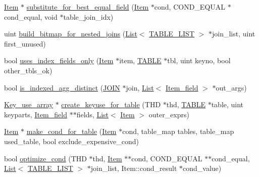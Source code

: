 \begin{DoxyCompactItemize}
\item 
\mbox{\hyperlink{classItem}{Item}} $\ast$ \mbox{\hyperlink{group__Query__Optimizer_ga253393c0747cf378b9cefa109662bd17}{substitute\+\_\+for\+\_\+best\+\_\+equal\+\_\+field}} (\mbox{\hyperlink{classItem}{Item}} $\ast$cond, C\+O\+N\+D\+\_\+\+E\+Q\+U\+AL $\ast$cond\+\_\+equal, void $\ast$table\+\_\+join\+\_\+idx)
\item 
uint \mbox{\hyperlink{group__Query__Optimizer_gab18726347ecf92d8985617dda1d60ba3}{build\+\_\+bitmap\+\_\+for\+\_\+nested\+\_\+joins}} (\mbox{\hyperlink{classList}{List}}$<$ \mbox{\hyperlink{structTABLE__LIST}{T\+A\+B\+L\+E\+\_\+\+L\+I\+ST}} $>$ $\ast$join\+\_\+list, uint first\+\_\+unused)
\item 
bool \mbox{\hyperlink{group__Query__Optimizer_ga652bf7109dfbe0fdd7deb75c05c0a7a3}{uses\+\_\+index\+\_\+fields\+\_\+only}} (\mbox{\hyperlink{classItem}{Item}} $\ast$item, \mbox{\hyperlink{structTABLE}{T\+A\+B\+LE}} $\ast$tbl, uint keyno, bool other\+\_\+tbls\+\_\+ok)
\item 
bool \mbox{\hyperlink{group__Query__Optimizer_gaa992e841315769954816105b951d3e17}{is\+\_\+indexed\+\_\+agg\+\_\+distinct}} (\mbox{\hyperlink{classJOIN}{J\+O\+IN}} $\ast$join, \mbox{\hyperlink{classList}{List}}$<$ \mbox{\hyperlink{classItem__field}{Item\+\_\+field}} $>$ $\ast$out\+\_\+args)
\item 
\mbox{\hyperlink{classMem__root__array}{Key\+\_\+use\+\_\+array}} $\ast$ \mbox{\hyperlink{group__Query__Optimizer_ga7a5efe6ddb0de3a2b43f36c3330354e7}{create\+\_\+keyuse\+\_\+for\+\_\+table}} (T\+HD $\ast$thd, \mbox{\hyperlink{structTABLE}{T\+A\+B\+LE}} $\ast$table, uint keyparts, \mbox{\hyperlink{classItem__field}{Item\+\_\+field}} $\ast$$\ast$fields, \mbox{\hyperlink{classList}{List}}$<$ \mbox{\hyperlink{classItem}{Item}} $>$ outer\+\_\+exprs)
\item 
\mbox{\hyperlink{classItem}{Item}} $\ast$ \mbox{\hyperlink{group__Query__Optimizer_gaedf2fb3248e5d013e6a74b29dd9e7429}{make\+\_\+cond\+\_\+for\+\_\+table}} (\mbox{\hyperlink{classItem}{Item}} $\ast$cond, table\+\_\+map tables, table\+\_\+map used\+\_\+table, bool exclude\+\_\+expensive\+\_\+cond)
\item 
bool \mbox{\hyperlink{group__Query__Optimizer_ga768e4d9b55252e39161f392f34cb5abc}{optimize\+\_\+cond}} (T\+HD $\ast$thd, \mbox{\hyperlink{classItem}{Item}} $\ast$$\ast$cond, C\+O\+N\+D\+\_\+\+E\+Q\+U\+AL $\ast$$\ast$cond\+\_\+equal, \mbox{\hyperlink{classList}{List}}$<$ \mbox{\hyperlink{structTABLE__LIST}{T\+A\+B\+L\+E\+\_\+\+L\+I\+ST}} $>$ $\ast$join\+\_\+list, Item\+::cond\+\_\+result $\ast$cond\+\_\+value)
$$
\end{DoxyCompactItemize}
